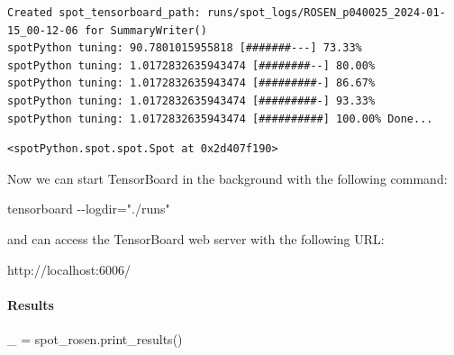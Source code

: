 \documentclass[
  letterpaper,
  DIV=11,
  numbers=noendperiod]{scrreprt}
\let\oldparagraph\paragraph
\renewcommand{\paragraph}[1]{\oldparagraph{#1}\mbox{}}
\newenvironment{Shaded}{\begin{snugshade}}{\end{snugshade}}
\newcommand{\NormalTok}[1]{\textcolor[rgb]{0.00,0.23,0.31}{#1}}
\newcommand{\OperatorTok}[1]{\textcolor[rgb]{0.37,0.37,0.37}{#1}}
\begin{document}
\begin{verbatim}
Created spot_tensorboard_path: runs/spot_logs/ROSEN_p040025_2024-01-15_00-12-06 for SummaryWriter()
spotPython tuning: 90.7801015955818 [#######---] 73.33% 
spotPython tuning: 1.0172832635943474 [########--] 80.00% 
spotPython tuning: 1.0172832635943474 [#########-] 86.67% 
spotPython tuning: 1.0172832635943474 [#########-] 93.33% 
spotPython tuning: 1.0172832635943474 [##########] 100.00% Done...
\end{verbatim}

\begin{verbatim}
<spotPython.spot.spot.Spot at 0x2d407f190>
\end{verbatim}

\begin{tcolorbox}[enhanced jigsaw, rightrule=.15mm, coltitle=black, title=\textcolor{quarto-callout-note-color}{\faInfo}\hspace{0.5em}{Note}, opacitybacktitle=0.6, bottomrule=.15mm, opacityback=0, left=2mm, colback=white, leftrule=.75mm, colframe=quarto-callout-note-color-frame, colbacktitle=quarto-callout-note-color!10!white, toprule=.15mm, toptitle=1mm, bottomtitle=1mm, titlerule=0mm, breakable, arc=.35mm]

Now we can start TensorBoard in the background with the following
command:

\begin{Shaded}
\begin{Highlighting}[]
\NormalTok{tensorboard {-}{-}logdir="./runs"}
\end{Highlighting}
\end{Shaded}

and can access the TensorBoard web server with the following URL:

\begin{Shaded}
\begin{Highlighting}[]
\NormalTok{http://localhost:6006/}
\end{Highlighting}
\end{Shaded}

\end{tcolorbox}

\paragraph{Results}\label{results-4}

\begin{Shaded}
\begin{Highlighting}[]
\NormalTok{\_ }\OperatorTok{=}\NormalTok{ spot\_rosen.print\_results()}
\end{Highlighting}
\end{Shaded}
\end{document}
